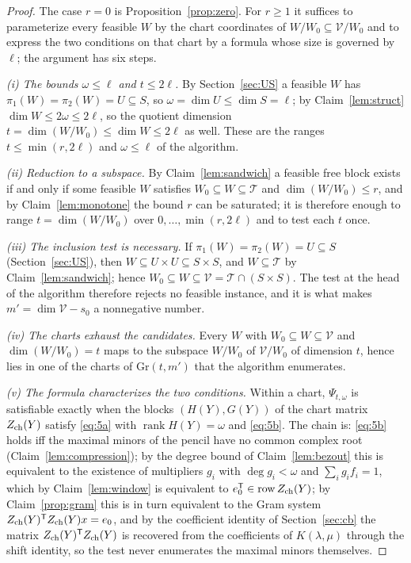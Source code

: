 \documentclass[journal]{IEEEtran}
\theoremstyle{plainn}
\theoremstyle{remark}
\begin{document}
\begin{proof}
The case $r=0$ is Proposition~\ref{prop:zero}. For $r\ge1$ it suffices to parameterize every feasible
$W$ by the chart coordinates of $W/W_0\subseteq\mathcal V/W_0$ and to express the two conditions on
that chart by a formula whose size is governed by $\ell$; the argument has six steps.

\emph{(i) The bounds $\omega\le\ell$ and $t\le2\ell$.} By Section~\ref{sec:US} a feasible $W$ has
$\pi_1(W)=\pi_2(W)=U\subseteq S$, so $\omega=\dim U\le\dim S=\ell$; by Claim~\ref{lem:struct}
$\dim W\le2\omega\le2\ell$, so the quotient dimension $t=\dim(W/W_0)\le\dim W\le2\ell$ as well.
These are the ranges $t\le\min(r,2\ell)$ and $\omega\le\ell$ of the algorithm.

\emph{(ii) Reduction to a subspace.} By Claim~\ref{lem:sandwich} a feasible free block exists if and
only if some feasible $W$ satisfies $W_0\subseteq W\subseteq\mathcal T$ and
$\dim(W/W_0)\le r$, and by Claim~\ref{lem:monotone} the bound $r$ can be saturated; it is therefore
enough to range $t=\dim(W/W_0)$ over $0,\dots,\min(r,2\ell)$ and to test each $t$ once.

\emph{(iii) The inclusion test is necessary.} If $\pi_1(W)=\pi_2(W)=U\subseteq S$
(Section~\ref{sec:US}), then $W\subseteq U\times U\subseteq S\times S$, and $W\subseteq\mathcal T$
by Claim~\ref{lem:sandwich}; hence $W_0\subseteq W\subseteq\mathcal V=\mathcal T\cap(S\times S)$.
The test at the head of the algorithm therefore rejects no feasible instance, and it is what makes
$m'=\dim\mathcal V-s_0$ a nonnegative number.

\emph{(iv) The charts exhaust the candidates.} Every $W$ with
$W_0\subseteq W\subseteq\mathcal V$ and $\dim(W/W_0)=t$ maps to the subspace $W/W_0$ of
$\mathcal V/W_0$ of dimension $t$, hence lies in one of the charts of $\mathrm{Gr}(t,m')$ that the
algorithm enumerates.

\emph{(v) The formula characterizes the two conditions.} Within a chart, $\Psi_{t,\omega}$ is
satisfiable exactly when the blocks $(H(Y),G(Y))$ of the chart matrix $Z_{\rm ch}(Y)$ satisfy
\eqref{eq:5a} with $\operatorname{rank}H(Y)=\omega$ and \eqref{eq:5b}. The chain is:
\eqref{eq:5b} holds iff the maximal minors of the pencil have no common complex root
(Claim~\ref{lem:compression}); by the degree bound of Claim~\ref{lem:bezout} this is equivalent to
the existence of multipliers $g_i$ with $\deg g_i<\omega$ and $\sum_i g_i f_i=1$, which by
Claim~\ref{lem:window} is equivalent to $e_0^{\mathsf T}\in\operatorname{row}Z_{\rm ch}(Y)$; by
Claim~\ref{prop:gram} this is in turn equivalent to the Gram system
$Z_{\rm ch}(Y)^{\mathsf T}Z_{\rm ch}(Y)x=e_0$, and by the coefficient identity of
Section~\ref{sec:cb} the matrix $Z_{\rm ch}(Y)^{\mathsf T}Z_{\rm ch}(Y)$ is recovered from the
coefficients of $K(\lambda,\mu)$ through the shift identity, so the test never enumerates the
maximal minors themselves.


\end{proof}
\end{document}

